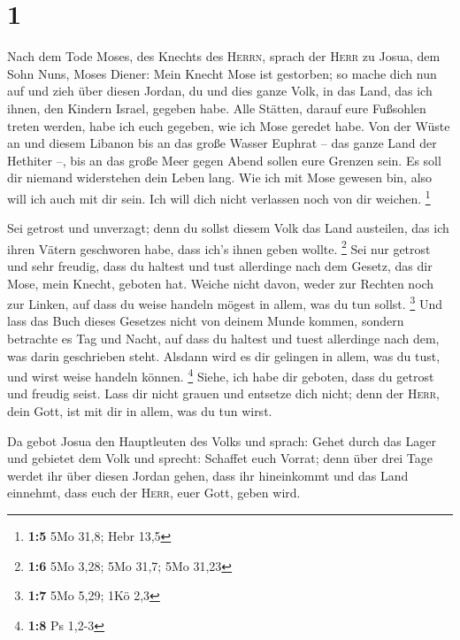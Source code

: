 \hypertarget{section}{%
\section{1}\label{section}}

 Nach dem Tode Moses, des Knechts des \textsc{Herrn},
sprach der \textsc{Herr} zu Josua, dem Sohn Nuns, Moses Diener:
 Mein Knecht Mose ist gestorben; so mache dich nun auf und
zieh über diesen Jordan, du und dies ganze Volk, in das Land, das ich
ihnen, den Kindern Israel, gegeben habe.  Alle Stätten,
darauf eure Fußsohlen treten werden, habe ich euch gegeben, wie ich Mose
geredet habe.  Von der Wüste an und diesem Libanon bis an
das große Wasser Euphrat -- das ganze Land der Hethiter --, bis an das
große Meer gegen Abend sollen eure Grenzen sein.  Es soll
dir niemand widerstehen dein Leben lang. Wie ich mit Mose gewesen bin,
also will ich auch mit dir sein. Ich will dich nicht verlassen noch von
dir weichen. \footnote{\textbf{1:5} 5Mo 31,8; Hebr 13,5}

 Sei getrost und unverzagt; denn du sollst diesem Volk das
Land austeilen, das ich ihren Vätern geschworen habe, dass ich's ihnen
geben wollte. \footnote{\textbf{1:6} 5Mo 3,28; 5Mo 31,7; 5Mo 31,23}
 Sei nur getrost und sehr freudig, dass du haltest und
tust allerdinge nach dem Gesetz, das dir Mose, mein Knecht, geboten hat.
Weiche nicht davon, weder zur Rechten noch zur Linken, auf dass du weise
handeln mögest in allem, was du tun sollst. \footnote{\textbf{1:7} 5Mo
  5,29; 1Kö 2,3}  Und lass das Buch dieses Gesetzes nicht
von deinem Munde kommen, sondern betrachte es Tag und Nacht, auf dass du
haltest und tuest allerdinge nach dem, was darin geschrieben steht.
Alsdann wird es dir gelingen in allem, was du tust, und wirst weise
handeln können. \footnote{\textbf{1:8} Ps 1,2-3}  Siehe,
ich habe dir geboten, dass du getrost und freudig seist. Lass dir nicht
grauen und entsetze dich nicht; denn der \textsc{Herr}, dein Gott, ist
mit dir in allem, was du tun wirst.

 Da gebot Josua den Hauptleuten des Volks und sprach:
 Gehet durch das Lager und gebietet dem Volk und sprecht:
Schaffet euch Vorrat; denn über drei Tage werdet ihr über diesen Jordan
gehen, dass ihr hineinkommt und das Land einnehmt, dass euch der
\textsc{Herr}, euer Gott, geben wird.

